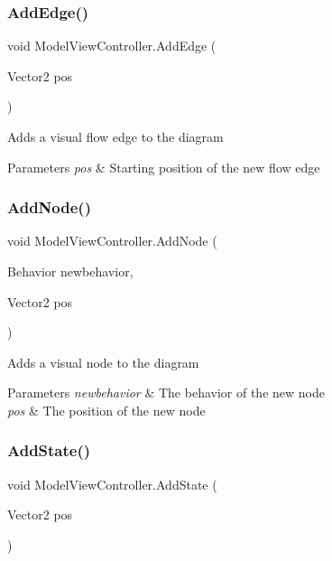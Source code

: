 \subsubsection{\texorpdfstring{Add\+Edge()}{AddEdge()}}
{\footnotesize\ttfamily void Model\+View\+Controller.\+Add\+Edge (\begin{DoxyParamCaption}\item[{Vector2}]{pos }\end{DoxyParamCaption})}



Adds a visual flow edge to the diagram 


\begin{DoxyParams}{Parameters}
{\em pos} & Starting position of the new flow edge\\
\hline
\end{DoxyParams}
\mbox{\label{class_model_view_controller_a08958c4f615ea68ec493fbb52139646c}} 
\subsubsection{\texorpdfstring{Add\+Node()}{AddNode()}}
{\footnotesize\ttfamily void Model\+View\+Controller.\+Add\+Node (\begin{DoxyParamCaption}\item[{Behavior}]{newbehavior,  }\item[{Vector2}]{pos }\end{DoxyParamCaption})}



Adds a visual node to the diagram 


\begin{DoxyParams}{Parameters}
{\em newbehavior} & The behavior of the new node\\
\hline
{\em pos} & The position of the new node\\
\hline
\end{DoxyParams}
\mbox{\label{class_model_view_controller_a1a64c20a275603c8c8352e82cc4c87ec}} 
\subsubsection{\texorpdfstring{Add\+State()}{AddState()}}
{\footnotesize\ttfamily void Model\+View\+Controller.\+Add\+State (\begin{DoxyParamCaption}\item[{Vector2}]{pos }\end{DoxyParamCaption})}



